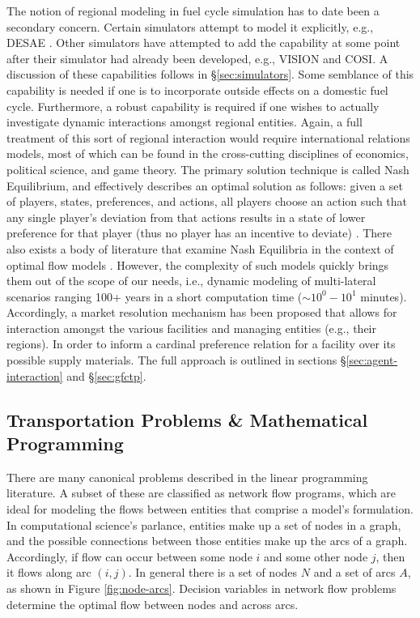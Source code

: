 The notion of regional modeling in fuel cycle simulation has to date been a
secondary concern. Certain simulators attempt to model it explicitly, e.g.,
DESAE \cite{iaea_nuclear_2010}. Other simulators have attempted to add the
capability at some point after their simulator had already been developed, e.g.,
VISION and COSI. A discussion of these capabilities follows in
\S\ref{sec:simulators}. Some semblance of this capability is needed if one is to
incorporate outside effects on a domestic fuel cycle. Furthermore, a robust
capability is required if one wishes to actually investigate dynamic
interactions amongst regional entities. Again, a full treatment of this sort of
regional interaction would require international relations models, most of which
can be found in the cross-cutting disciplines of economics, political science,
and game theory. The primary solution technique is called Nash Equilibrium, and
effectively describes an optimal solution as follows: given a set of players,
states, preferences, and actions, all players choose an action such that any
single player's deviation from that actions results in a state of lower
preference for that player (thus no player has an incentive to deviate)
\cite{mccarty_political_2007}. There also exists a body of literature that
examine Nash Equilibria in the context of optimal flow models
\cite{mazumdar_fairness_1991,nagurney_supply_2002,song_nash_2002}. However, the
complexity of such models quickly brings them out of the scope of our needs,
i.e., dynamic modeling of multi-lateral scenarios ranging 100+ years in a short
computation time ($\sim 10^0 - 10^1$ minutes). Accordingly, a market resolution mechanism
has been proposed that allows for interaction amongst the various facilities and
managing entities (e.g., their regions). In order to inform a cardinal
preference \cite{strotz_cardinal_1953} relation for a facility over its possible
supply materials. The full approach is outlined in sections
\S\ref{sec:agent-interaction} and \S\ref{sec:gfctp}.

\subsection{Transportation Problems \& Mathematical Programming}\label{intro:prog}
There are many canonical problems described in the linear programming
literature. A subset of these are classified as network flow programs, which are
ideal for modeling the flows between entities that comprise a model's
formulation. In computational science's parlance, entities make up a set of
nodes in a graph, and the possible connections between those entities make up
the arcs of a graph. Accordingly, if flow can occur between some node $i$ and
some other node $j$, then it flows along arc $(i, j)$. In general there is a set
of nodes $N$ and a set of arcs $A$, as shown in Figure
\ref{fig:node-arcs}. Decision variables in network flow problems determine the
optimal flow between nodes and across arcs.

